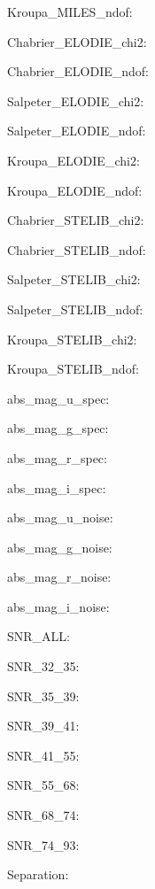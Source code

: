 \item Kroupa\_MILES\_ndof: 
\item Chabrier\_ELODIE\_chi2: 
\item Chabrier\_ELODIE\_ndof: 
\item Salpeter\_ELODIE\_chi2: 
\item Salpeter\_ELODIE\_ndof: 
\item Kroupa\_ELODIE\_chi2: 
\item Kroupa\_ELODIE\_ndof: 
\item Chabrier\_STELIB\_chi2: 
\item Chabrier\_STELIB\_ndof: 
\item Salpeter\_STELIB\_chi2: 
\item Salpeter\_STELIB\_ndof: 
\item Kroupa\_STELIB\_chi2: 
\item Kroupa\_STELIB\_ndof: 
\item abs\_mag\_u\_spec: 
\item abs\_mag\_g\_spec: 
\item abs\_mag\_r\_spec: 
\item abs\_mag\_i\_spec: 
\item abs\_mag\_u\_noise: 
\item abs\_mag\_g\_noise: 
\item abs\_mag\_r\_noise: 
\item abs\_mag\_i\_noise: 
\item SNR\_ALL: 
\item SNR\_32\_35: 
\item SNR\_35\_39: 
\item SNR\_39\_41: 
\item SNR\_41\_55: 
\item SNR\_55\_68: 
\item SNR\_68\_74: 
\item SNR\_74\_93: 
\item Separation: 
